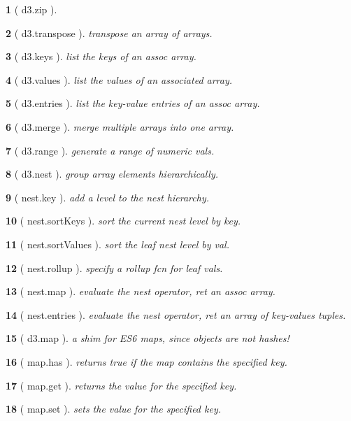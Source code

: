 \documentclass[10pt,landscape,letterpaper]{article}
\newcounter{thm}
\theoremstyle{mytheoremstyle}
\newtheorem*{thm}{}
\begin{document}
\begin{multicols}{3}
\begin{thm} [ d3.zip ]
\end{thm}\begin{thm} [ d3.transpose ]  transpose an array of arrays.
\end{thm}\begin{thm} [ d3.keys ]  list the keys of an assoc array.
\end{thm}\begin{thm} [ d3.values ]  list the values of an associated array.
\end{thm}\begin{thm} [ d3.entries ]  list the key-value entries of an assoc array.
\end{thm}\begin{thm} [ d3.merge ]  merge multiple arrays into one array.
\end{thm}\begin{thm} [ d3.range ]  generate a range of numeric vals.
\end{thm}\begin{thm} [ d3.nest ]  group array elements hierarchically.
\end{thm}\begin{thm} [ nest.key ]  add a level to the nest hierarchy.
\end{thm}\begin{thm} [ nest.sortKeys ]  sort the current nest level by key.
\end{thm}\begin{thm} [ nest.sortValues ]  sort the leaf nest level by val.
\end{thm}\begin{thm} [ nest.rollup ]  specify a rollup fcn for leaf vals.
\end{thm}\begin{thm} [ nest.map ]  evaluate the nest operator, ret an assoc array.
\end{thm}\begin{thm} [ nest.entries ]  evaluate the nest operator, ret an array of key-values tuples.
\end{thm}\begin{thm} [ d3.map ]  a shim for ES6 maps, since objects are not hashes!
\end{thm}\begin{thm} [ map.has ]  returns true if the map contains the specified key.
\end{thm}\begin{thm} [ map.get ]  returns the value for the specified key.
\end{thm}\begin{thm} [ map.set ]  sets the value for the specified key.

\end{thm}
\end{multicols}
\end{document}
